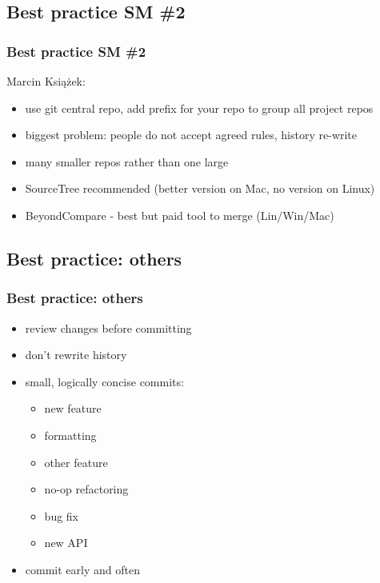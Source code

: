 \documentclass{beamer}
\begin{document}
	\subsection{Best practice SM \#2}
		\begin{frame}
			\frametitle{Best practice SM \#2}
            Marcin Książek:
			\begin{itemize}
                \item use git central repo, add prefix for your repo to group all project repos
                \item biggest problem: people do not accept agreed rules, history re-write
                \item many smaller repos rather than one large
                \item SourceTree recommended (better version on Mac, no version on Linux)
                \item BeyondCompare - best but paid tool to merge (Lin/Win/Mac)
			\end{itemize}
		\end{frame}
				
	\subsection{Best practice: others}
		\begin{frame}
			\frametitle{Best practice: others}
			\begin{itemize}
                \item review changes before committing
                \item don't rewrite history
                \item small, logically concise commits:
			    \begin{itemize}
                    \item new feature
                    \item formatting
                    \item other feature
                    \item no-op refactoring
                    \item bug fix
                    \item new API
			    \end{itemize}
                \item commit early and often
			\end{itemize}
		\end{frame}
		
\end{document}
